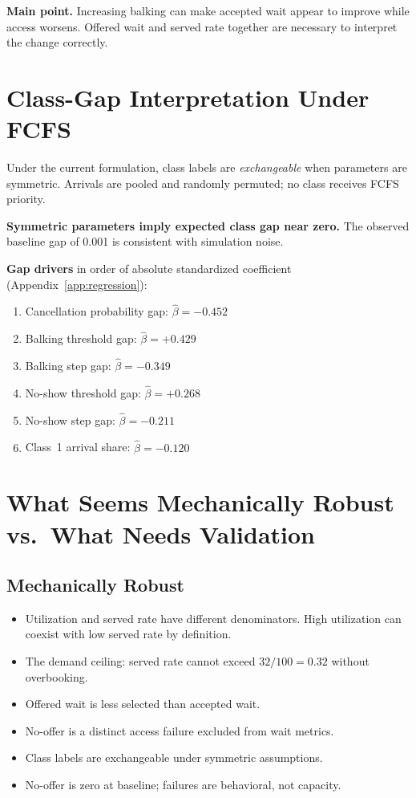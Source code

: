 \documentclass[11pt]{article}
\begin{document}
\textbf{Main point.}  Increasing balking can make accepted wait appear
to improve while access worsens.  Offered wait and served rate together
are necessary to interpret the change correctly.

\section{Class-Gap Interpretation Under FCFS}

Under the current formulation, class labels are \emph{exchangeable}
when parameters are symmetric.  Arrivals are pooled and randomly
permuted; no class receives FCFS priority.

\textbf{Symmetric parameters imply expected class gap near zero.}
The observed baseline gap of 0.001 is consistent with simulation noise.

\textbf{Gap drivers} in order of absolute standardized coefficient
(Appendix~\ref{app:regression}):
\begin{enumerate}[leftmargin=2em, itemsep=3pt]
  \item Cancellation probability gap: $\hat{\beta} = -0.452$
  \item Balking threshold gap: $\hat{\beta} = +0.429$
  \item Balking step gap: $\hat{\beta} = -0.349$
  \item No-show threshold gap: $\hat{\beta} = +0.268$
  \item No-show step gap: $\hat{\beta} = -0.211$
  \item Class~1 arrival share: $\hat{\beta} = -0.120$
\end{enumerate}

\section{What Seems Mechanically Robust vs.\ What Needs Validation}
\label{sec:validation}

\subsection{Mechanically Robust}

\begin{itemize}[leftmargin=1.5em, itemsep=4pt]
  \item Utilization and served rate have different denominators.
    High utilization can coexist with low served rate by definition.
  \item The demand ceiling: served rate cannot exceed $32/100 = 0.32$
    without overbooking.
  \item Offered wait is less selected than accepted wait.
  \item No-offer is a distinct access failure excluded from wait metrics.
  \item Class labels are exchangeable under symmetric assumptions.
  \item No-offer is zero at baseline; failures are behavioral, not
    capacity.
\end{itemize}
\end{document}
